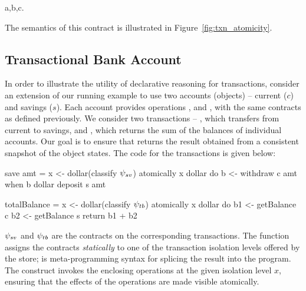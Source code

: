 \vspace{-1.5em}
\begin{smathpar}
\forall a,b,c.~ ~\wedge~  ~\wedge~ 
\Rightarrow {}
\end{smathpar}

\noindent The semantics of this contract is illustrated in
Figure~\ref{fig:txn_atomicity}.

\subsection{Transactional Bank Account}

In order to illustrate the utility of declarative reasoning for transactions,
consider an extension of our running example to use two accounts (objects) --
current ($c$) and savings ($s$). Each account provides operations
,  and , with the same contracts as
defined previously. We consider two transactions -- , which
transfers  from current to savings, and , which
returns the sum of the balances of individual accounts. Our goal is to ensure
that  returns the result obtained from a consistent snapshot
of the object states. The \name code for the transactions is given below:
\vspace{-1em}

\noindent \begin{minipage}[t]{0.53\columnwidth}
\begin{codehaskell}
save amt =
  x <- dollar(classify $\psi_{sv}$)
  atomically x dollar do
    b <- withdraw c amt
    when b dollar deposit s amt
\end{codehaskell}
\end{minipage}
\begin{minipage}[t]{0.47\columnwidth}
\begin{codehaskell}
totalBalance =
  x <- dollar(classify $\psi_{tb}$)
  atomically x dollar do
    b1 <- getBalance c
    b2 <- getBalance s
    return b1 + b2
\end{codehaskell}
\end{minipage}

$\psi_{sv}$ and $\psi_{tb}$ are the contracts on the corresponding
transactions. The function  assigns the contracts
\emph{statically} to one of the transaction isolation levels offered by the
store; \cf{\$()} is meta-programming syntax for splicing the result into the
program. The  construct invokes the enclosing operations at the
given isolation level $x$, ensuring that the effects of the operations are made
visible atomically.

